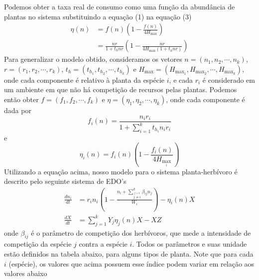 \documentclass{article}
\begin{document}
Podemos obter a taxa real de consumo como uma função da abundância de plantas no sistema substituindo a equação (1) na equação (3)
\begin{align}
    \eta(n) &= f(n)\left(1 - \frac{f(n)}{4H_{\max}}\right) \nonumber \\
            &= \frac{n r}{1 + t_h n r} \left( 1 - \frac{n r}{4H_{\max}(1 + t_h n r)} \right)
\end{align}
Para generalizar o modelo obtido, consideramos os vetores $n = (n_1,n_2,\cdots,n_k)$, $r = (r_1,r_2,\cdots,r_k)$, $t_h = (t_{h_1},t_{h_2},\cdots,t_{h_k})$ e $H_{\max} = (H_{\max_1}, H_{\max_2},\cdots,H_{\max_k})$, onde cada componente é relativo à planta da espécie $i$, e cada $r_i$ é considerado em um ambiente em que não há competição de recursos pelas plantas. Podemos então obter $f = (f_1,f_2,\cdots,f_k)$ e $\eta = (\eta_1,\eta_2,\cdots,\eta_k)$, onde cada componente é dada por
\begin{equation}
    f_i(n) = \frac{n_i r_i}{1 + \sum_{i=1}^{k} t_{h_i} n_i r_i}
\end{equation}
e
\begin{equation}
    \eta_i(n)  = f_i(n)\left(1 - \frac{f_i(n)}{4H_{\max_i}}\right)
\end{equation}
Utilizando a equação acima, nosso modelo para o sistema planta-herbívoro é descrito pelo seguinte sistema de EDO's
\begin{equation}
\begin{aligned}
    \frac{dn_i}{dt} &= r_i n_i \left( 1 - \frac{n_i + \sum_{\overset{j=1}{j \neq i}}^k \beta_{ij}n_j}{W_i} \right) - \eta_i(n)X \\
    \frac{dX}{dt}   &= \sum_{j=1}^k Y_j\eta_j(n)X - XZ
\end{aligned}
\end{equation}
onde $\beta_{ij}$ é o parâmetro de competição dos herbívoros, que mede a intensidade de competição da espécie $j$ contra a espécie $i$. Todos os parâmetros e suas unidade estão definidos na tabela abaixo, para alguns tipos de planta. Note que para cada $i$ (espécie), os valores que acima possuem esse índice podem variar em relação aos valores abaixo
\end{document}

